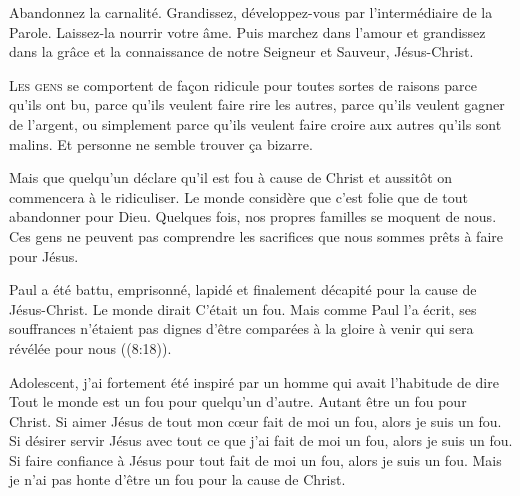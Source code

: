 Abandonnez la carnalité. Grandissez, développez-vous
 par l'intermédiaire de la Parole. Laissez-la nourrir votre âme.
 Puis marchez dans l'amour et grandissez dans la
 grâce et la connaissance de notre Seigneur et Sauveur, Jésus-Christ.

\dvrule






\lettrine{L}{es gens} se comportent de fa\c{c}on ridicule
 pour toutes sortes de raisons \ocadr parce qu'ils ont bu,
 parce qu'ils veulent faire rire les autres,
 parce qu'ils veulent gagner de l'argent,
 ou simplement parce qu'ils veulent faire croire aux autres qu'ils sont malins.
 Et personne ne semble trouver \c{c}a bizarre.

Mais que quelqu'un déclare qu'il est fou à cause de Christ
 et aussitôt on commencera à le ridiculiser.
 Le monde considère que c'est folie que de tout abandonner pour Dieu.
 Quelques fois, nos propres familles se moquent de nous.
 Ces gens ne peuvent pas comprendre les sacrifices
 que nous sommes prêts à faire pour Jésus.

Paul a été battu, emprisonné, lapidé et finalement décapité
 pour la cause de Jésus-Christ. Le monde dirait\frcolon{} 
 \Og C'était un fou. \Fg{}
 Mais comme Paul l'a écrit, ses souffrances n'étaient pas
 \Og dignes d'être comparées à la gloire à venir
 qui sera révélée pour nous \Fg{}\linebreak ((8:18)).


Adolescent, j'ai fortement été inspiré par un homme
 qui avait l'habitude de dire\frcolon{} 
 \Og Tout le monde est un fou pour quelqu'un d'autre.
 Autant être un fou pour Christ. \Fg{}
 Si aimer Jésus de tout mon c\oe{}ur fait de moi un fou,
 alors je suis un fou. Si désirer servir Jésus avec tout ce que j'ai
 fait de moi un fou, alors je suis un fou.
 Si faire confiance à Jésus pour tout fait de moi un fou,
 alors je suis un fou.
 Mais je n'ai pas honte d'être un fou pour la cause de Christ.

